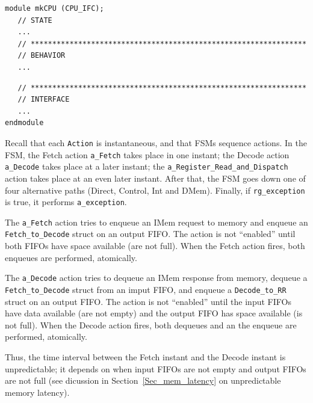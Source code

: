 {\small
\begin{Verbatim}
module mkCPU (CPU_IFC);
   // STATE
   ...
   // ****************************************************************
   // BEHAVIOR
   ...
\end{Verbatim}
}




{\small
\begin{Verbatim}
   // ****************************************************************
   // INTERFACE
   ...
endmodule
\end{Verbatim}
}

Recall that each \verb|Action| is instantaneous, and that FSMs
sequence actions.  In the FSM, the Fetch action \verb|a_Fetch| takes
place in one instant; the Decode action \verb|a_Decode| takes place at
a later instant; the \verb|a_Register_Read_and_Dispatch| action takes
place at an even later instant.  After that, the FSM goes down one of
four alternative paths (Direct, Control, Int and DMem).  Finally, if
\verb|rg_exception| is true, it performs \verb|a_exception|.

The \verb|a_Fetch| action tries to enqueue an IMem request to memory
and enqueue an \verb|Fetch_to_Decode| struct on an output FIFO.  The
action is not ``enabled'' until both FIFOs have space available (are
not full).  When the Fetch action fires, both enqueues are performed,
atomically.

The \verb|a_Decode| action tries to dequeue an IMem response from
memory, dequeue a \verb|Fetch_to_Decode| struct from an imput FIFO,
and enqueue a \verb|Decode_to_RR| struct on an output FIFO.  The
action is not ``enabled'' until the input FIFOs have data available
(are not empty) and the output FIFO has space available (is not full).
When the Decode action fires, both dequeues and an the enqueue are
performed, atomically.

Thus, the time interval between the Fetch instant and the Decode
instant is unpredictable; it depends on when input FIFOs are not empty
and output FIFOs are not full (see dicussion in
Section~\ref{Sec_mem_latency} on unpredictable memory latency).

\vspace{2ex}

